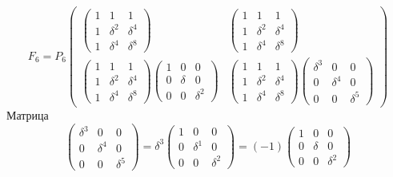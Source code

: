 \[
    F_6
    = P_6
    \begin{pmatrix}
        \begin{pmatrix}
            1 & 1        & 1        \\
            1 & \delta^2 & \delta^4 \\
            1 & \delta^4 & \delta^8
        \end{pmatrix}
        &
        \begin{pmatrix}
            1 & 1        & 1        \\
            1 & \delta^2 & \delta^4 \\
            1 & \delta^4 & \delta^8
        \end{pmatrix}
        \\
        \begin{pmatrix}
            1 & 1        & 1        \\
            1 & \delta^2 & \delta^4 \\
            1 & \delta^4 & \delta^8
        \end{pmatrix}
        \begin{pmatrix}
            1 & 0      & 0        \\
            0 & \delta & 0        \\
            0 & 0      & \delta^2
        \end{pmatrix}
        &
        \begin{pmatrix}
            1 & 1        & 1        \\
            1 & \delta^2 & \delta^4 \\
            1 & \delta^4 & \delta^8
        \end{pmatrix}
        \begin{pmatrix}
            \delta^3 & 0        & 0        \\
            0        & \delta^4 & 0        \\
            0        & 0        & \delta^5
        \end{pmatrix}
    \end{pmatrix}
\]
Матрица
\[
    \begin{pmatrix}
        \delta^3 & 0        & 0        \\
        0        & \delta^4 & 0        \\
        0        & 0        & \delta^5
    \end{pmatrix}
    = \delta^3
    \begin{pmatrix}
        1 & 0        & 0        \\
        0 & \delta^1 & 0        \\
        0 & 0        & \delta^2
    \end{pmatrix}
    = (-1)
    \begin{pmatrix}
        1 & 0      & 0        \\
        0 & \delta & 0        \\
        0 & 0      & \delta^2
    \end{pmatrix}
\]
